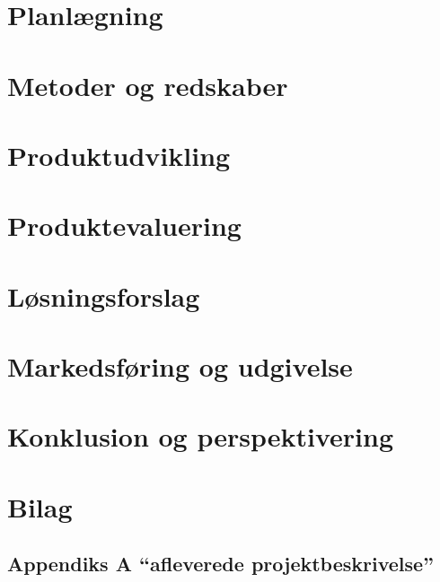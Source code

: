 \documentclass[a4paper, 12pt]{article}
\begin{document}
\section{Planlægning}

\newpage

\section{Metoder og redskaber}

\newpage

\section{Produktudvikling}\label{sec:produktudvikling}

\newpage

\section{Produktevaluering}

\newpage

\section{Løsningsforslag}

\newpage

\section{Markedsføring og udgivelse}

\newpage

\section{Konklusion og perspektivering}

\newpage


\printbibliography[heading=bibintoc, title={Bibliografi}]
\newpage

\section{Bilag}
\appendix

\subsection{Appendiks A ``afleverede projektbeskrivelse''}
\renewcommand{\thepage}{B\arabic{page}}

\newpage
\end{document}
